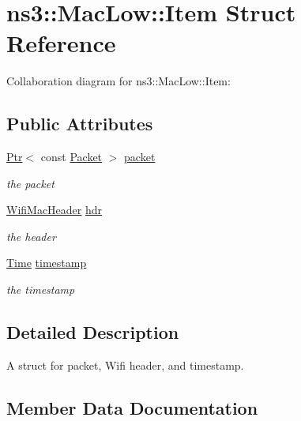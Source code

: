 \hypertarget{structns3_1_1MacLow_1_1Item}{}\section{ns3\+:\+:Mac\+Low\+:\+:Item Struct Reference}
\label{structns3_1_1MacLow_1_1Item}


Collaboration diagram for ns3\+:\+:Mac\+Low\+:\+:Item\+:
\subsection*{Public Attributes}
\begin{DoxyCompactItemize}
\item 
\hyperlink{classns3_1_1Ptr}{Ptr}$<$ const \hyperlink{classns3_1_1Packet}{Packet} $>$ \hyperlink{structns3_1_1MacLow_1_1Item_a0176929020a1820fb54c53ac54f75b77}{packet}
\begin{DoxyCompactList}\small\item\em the packet \end{DoxyCompactList}\item 
\hyperlink{classns3_1_1WifiMacHeader}{Wifi\+Mac\+Header} \hyperlink{structns3_1_1MacLow_1_1Item_a77cca1745aa1495568494a5b5df62170}{hdr}
\begin{DoxyCompactList}\small\item\em the header \end{DoxyCompactList}\item 
\hyperlink{classns3_1_1Time}{Time} \hyperlink{structns3_1_1MacLow_1_1Item_ab00a7d13691ec070b48a1821f71d368f}{timestamp}
\begin{DoxyCompactList}\small\item\em the timestamp \end{DoxyCompactList}\end{DoxyCompactItemize}


\subsection{Detailed Description}
A struct for packet, Wifi header, and timestamp. 

\subsection{Member Data Documentation}
